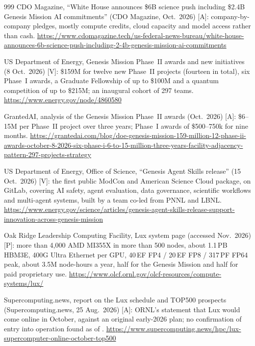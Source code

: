 \begin{thebibliography}{999}
 CDO Magazine, ``White House announces \$6B science push including \$2.4B Genesis Mission AI commitments'' (CDO Magazine, Oct.\ 2026) [A]: company-by-company pledges, mostly compute credits, cloud capacity and model access rather than cash. \url{https://www.cdomagazine.tech/us-federal-news-bureau/white-house-announces-6b-science-push-including-2-4b-genesis-mission-ai-commitments}

 US Department of Energy, Genesis Mission Phase~II awards and new initiatives (8 Oct.\ 2026) [V]: \$159M for twelve new Phase~II projects (fourteen in total), six Phase~I awards, a Graduate Fellowship of up to \$100M and a quantum competition of up to \$215M; an inaugural cohort of 297 teams. \url{https://www.energy.gov/node/4860580}

 GrantedAI, analysis of the Genesis Mission Phase~II awards (Oct.\ 2026) [A]: \$6--15M per Phase~II project over three years; Phase~I awards of \$500--750k for nine months. \url{https://grantedai.com/blog/doe-genesis-mission-159-million-12-phase-ii-awards-october-8-2026-six-phase-i-6-to-15-million-three-years-facility-adjacency-pattern-297-projects-strategy}

 US Department of Energy, Office of Science, ``Genesis Agent Skills release'' (15 Oct.\ 2026) [V]: the first public ModCon and American Science Cloud package, on GitLab, covering AI safety, agent evaluation, data governance, scientific workflows and multi-agent systems, built by a team co-led from PNNL and LBNL. \url{https://www.energy.gov/science/articles/genesis-agent-skills-release-support-innovation-across-genesis-mission}

 Oak Ridge Leadership Computing Facility, Lux system page (accessed Nov.\ 2026) [P]: more than 4,000 AMD MI355X in more than 500 nodes, about 1.1\,PB HBM3E, 400G Ultra Ethernet per GPU, 40\,EF FP4 / 20\,EF FP8 / 317\,PF FP64 peak, about 3.5M node-hours a year, half for the Genesis Mission and half for paid proprietary use. \url{https://www.olcf.ornl.gov/olcf-resources/compute-systems/lux/}

 Supercomputing.news, report on the Lux schedule and TOP500 prospects (Supercomputing.news, 25 Aug.\ 2026) [A]: ORNL's statement that Lux would come online in October, against an original early-2026 plan; no confirmation of entry into operation found as of \datafreeze. \url{https://www.supercomputing.news/hpc/lux-supercomputer-online-october-top500}


\end{thebibliography}
